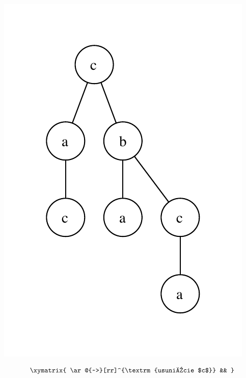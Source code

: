 \begin{przyklad}
	\begin{center}
		\begin{minipage}[t]{.25\linewidth}
			\vspace{0pt}
			\centering
			\includegraphics[scale=0.6]{rysunki/w12-usuniecie_c_1.pdf}
		\end{minipage}
		\begin{minipage}[t]{.25\linewidth}
			\centering 
			\vspace{40pt}
			\begin{displaymath}
				\xymatrix{ 
					\ar@{~>}[rr]^{\textrm{usunięcie $c$}} &&
				}
			\end{displaymath}
		\end{minipage}
		\begin{minipage}[t]{.25\linewidth}
			\vspace{0pt}
			\centering

\end{minipage}
\end{center}
\end{przyklad}
